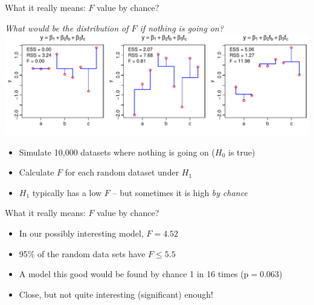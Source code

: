\documentclass[xcolor=x11names,compress]{beamer}
\renewcommand{\(}{\begin{columns}}
\renewcommand{\)}{\end{columns}}
\newcommand{\<}[1]{\begin{column}{#1}}
\renewcommand{\>}{\end{column}}
\begin{document}
\begin{frame}{What it really means: $F$ value by chance?}

\begin{center}
    \it What would be the distribution of $F$ if nothing is going on?\\
    \pause
    \includegraphics[width=\textwidth]{F_extremes.pdf}
\end{center}

\pause 
\begin{itemize}[<+->]\itemsep6pt
    \item Simulate 10,000 datasets where nothing is going on ($H_0$ is true)
    \item Calculate $F$ for each random dataset under $H_1$
    \item $H_1$ typically has a low $F$ -- but sometimes it is high {\it by chance} 
\end{itemize}

\end{frame}


\begin{frame}{What it really means: $F$ value by chance?}


\centerline{}

\begin{itemize}[<+->]\itemsep6pt
\item In our possibly interesting model, $F = 4.52$
\item 95\% of the random data sets have $F\le 5.5$
\item A model this good would be found by chance 1 in 16 times (p$=0.063$)
\item Close, but not quite interesting (significant) enough!
\end{itemize}

\end{frame}
\end{document}

